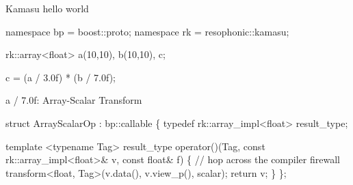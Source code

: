
\begin{frame}[fragile]{Kamasu hello world}
\begin{semiverbatim}namespace \alert<1>{bp = boost::proto};
namespace \alert<1>{rk = resophonic::kamasu};

rk::array<float> a(10,10), b(10,10), c;

\alert<2>{c = (a / 3.0f) * (b / 7.0f);}

\end{semiverbatim}


\end{frame}



\begin{frame}[fragile]{a / 7.0f:  Array-Scalar Transform}
\begin{semiverbatim}

struct ArrayScalarOp : bp::callable
\{
  typedef rk::array_impl<float> result_type;

  template <typename Tag>
  result_type 
  operator()(Tag, const rk::array_impl<float>& v, 
             const float& f)
  \{
    // hop across the compiler firewall
    transform<float, Tag>(v.data(), v.view_p(), scalar);
    return v;
  \}
\};


\end{semiverbatim}
\end{frame}


